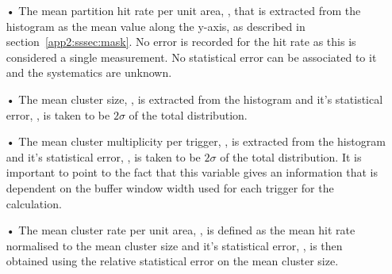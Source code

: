 	\begin{itemize}
		\item[•] The mean partition hit rate per unit area, , that is extracted from the histogram  as the mean value along the y-axis, as described in section~\ref{app2:sssec:mask}. No error is recorded for the hit rate as this is considered a single measurement. No statistical error can be associated to it and the systematics are unknown.
		\item[•] The mean cluster size, , is extracted from the histogram  and it's statistical error, , is taken to be $2\sigma$ of the total distribution.
		\item[•] The mean cluster multiplicity per trigger, , is extracted from the histogram  and it's statistical error, , is taken to be $2\sigma$ of the total distribution. It is important to point to the fact that this variable gives an information that is dependent on the buffer window width used for each trigger for the calculation.
		\item[•] The mean cluster rate per unit area, , is defined as the mean hit rate normalised to the mean cluster size and it's statistical error, , is then obtained using the relative statistical error on the mean cluster size.
	\end{itemize}
		
